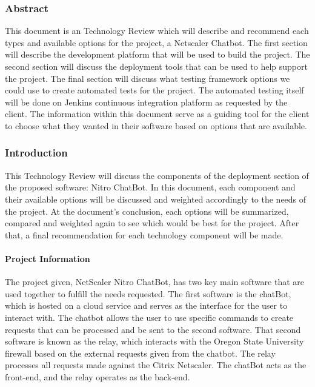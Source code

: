 \subsubsection{Abstract}
This document is an Technology Review which will describe and recommend each types and available options for the project, a Netscaler Chatbot.
The first section will describe the development platform that will be used to build the project.
The second section will discuss the deployment tools that can be used to help support the project.
The final section will discuss what testing framework options we could use to create automated tests for the project.
The automated testing itself will be done on Jenkins continuous integration platform as requested by the client.
The information within this document serve as a guiding tool for the client to choose what they wanted in their software based on options that are available.

\subsubsection{Introduction}
This Technology Review will discuss the components of the deployment section of the proposed software: Nitro ChatBot.
In this document, each component and their available options will be discussed and weighted accordingly to the needs of the project.
At the document's conclusion, each options will be summarized, compared and weighted again to see which would be best for the project.
After that, a final recommendation for each technology component will be made.

\paragraph{Project Information}
The project given, NetScaler Nitro ChatBot, has two key main software that are used together to fulfill the needs requested.
The first software is the chatBot, which is hosted on a cloud service and serves as the interface for the user to interact with.
The chatbot allows the user to use specific commands to create requests that can be processed and be sent to the second software.
That second software is known as the relay, which interacts with the Oregon State University firewall based on the external requests given from the chatbot.
The relay processes all requests made against the Citrix Netscaler.
The chatBot acts as the front-end, and the relay operates as the back-end.


